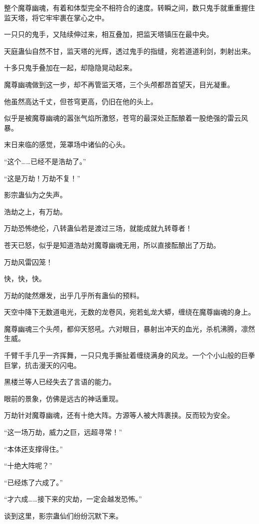 \begin{this_body}
整个魔尊幽魂，有着和体型完全不相符合的速度。转瞬之间，数只鬼手就重重握住监天塔，将它牢牢裹在掌心之中。

一只只的鬼手，又陆续伸过来，相互叠加，把监天塔镇压在最中央。

天庭蛊仙自然不甘，监天塔的光辉，透过鬼手的指缝，宛若道道利剑，刺射出来。

十多只鬼手叠加在一起，却隐隐晃动起来。

魔尊幽魂做到这一步，却不再管监天塔，三个头颅都昂首望天，目光凝重。

他虽然高达千丈，但苍穹更高，仍旧在他的头上。

似乎是被魔尊幽魂的嚣张气焰所激怒，苍穹的最深处正酝酿着一股绝强的雷云风暴。

末日来临的感觉，笼罩场中诸仙的心头。

“这个……已经不是浩劫了。”

“这是万劫！万劫不复！”

影宗蛊仙为之失声。

浩劫之上，有万劫。

万劫恐怖绝伦，八转蛊仙若是渡过三场，就能成就九转尊者！

苍天已怒，似乎是知道浩劫对魔尊幽魂无用，所以直接酝酿出了万劫。

万劫风雷囚笼！

快，快，快。

万劫的陡然爆发，出乎几乎所有蛊仙的预料。

天空中降下无数道电光，无数的龙卷风，宛若虬龙大蟒，缠绕在魔尊幽魂的身上。

魔尊幽魂三个头颅，都仰天怒吼。六对眼目，暴射出冲天的血光，杀机沸腾，凛然生威。

千臂千手几乎一齐挥舞，一只只鬼手撕扯着缠绕满身的风龙。一个个小山般的巨拳巨掌，抗击漫天的闪电。

黑楼兰等人已经失去了言语的能力。

眼前的景象，仿佛是远古的神话重现。

万劫针对魔尊幽魂，还有十绝大阵。方源等人被大阵裹挟。反而较为安全。

“这一场万劫，威力之巨，远超寻常！”

“本体还支撑得住。”

“十绝大阵呢？”

“已经炼了六成了。”

“才六成……接下来的灾劫，一定会越发恐怖。”

谈到这里，影宗蛊仙们纷纷沉默下来。


\end{this_body}
